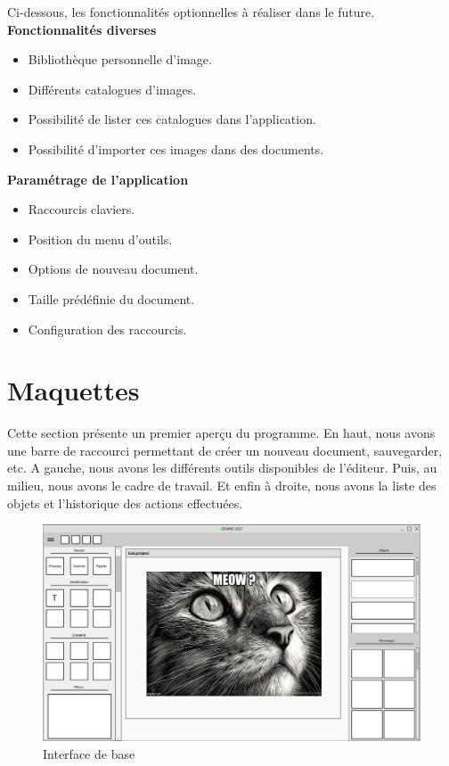 \documentclass[11pt, a4paper, french]{article}
\begin{document}
		Ci-dessous, les fonctionnalités optionnelles à réaliser dans le future.\\

			\textbf{Fonctionnalités diverses}
			\begin{itemize}[label=\textbullet]
				\item Bibliothèque personnelle d’image.
				\item Différents catalogues d’images.
				\item Possibilité de lister ces catalogues dans l’application.
				\item Possibilité d’importer ces images dans des documents. \\
			\end{itemize}

			\textbf{Paramétrage de l’application}
			\begin{itemize}[label=\textbullet]
				\item Raccourcis claviers.
				\item Position du menu d’outils.
				\item Options de nouveau document.
				\item Taille prédéfinie du document.
				\item Configuration des raccourcis. \\
			\end{itemize}


	\pagebreak
	\section{Maquettes}

		Cette section présente un premier aperçu du programme. En haut, nous avons une barre de raccourci permettant de créer un nouveau document, sauvegarder, etc. A gauche, nous avons les différents outils disponibles de l'éditeur. Puis, au milieu, nous avons le cadre de travail. Et enfin à droite, nous avons la liste des objets et l'historique des actions effectuées.\\

		\begin{figure}[h!]
			\centering
			\graphicspath{{Mockups/}}
			\includegraphics[scale=0.3]{mockups/home_page.png}
			\caption{\label{étiquette} Interface de base}
		\end{figure}
\end{document}
